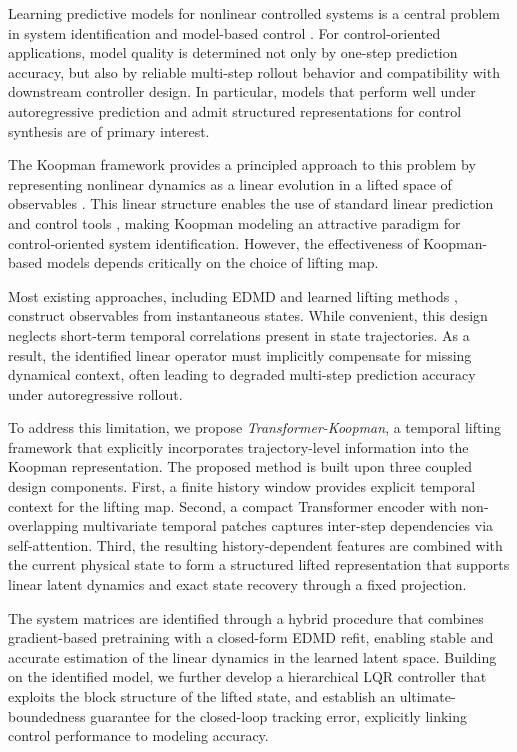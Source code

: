 \documentclass[journal]{IEEEtran}
\begin{document}
Learning predictive models for nonlinear controlled systems is a central problem in system identification and model-based control \cite{ljung1999system, vanoverschee1994n4sid, nelles2020nonlinear}. For control-oriented applications, model quality is determined not only by one-step prediction accuracy, but also by reliable multi-step rollout behavior and compatibility with downstream controller design. In particular, models that perform well under autoregressive prediction and admit structured representations for control synthesis are of primary interest.

The Koopman framework provides a principled approach to this problem by representing nonlinear dynamics as a linear evolution in a lifted space of observables \cite{koopman1931hamiltonian, brunton2022modern}. This linear structure enables the use of standard linear prediction and control tools \cite{otto2021koopman, korda2018linear}, making Koopman modeling an attractive paradigm for control-oriented system identification. However, the effectiveness of Koopman-based models depends critically on the choice of lifting map.

Most existing approaches, including EDMD \cite{williams2015data} and learned lifting methods \cite{lusch2018deep, takeishi2017koopman}, construct observables from instantaneous states. While convenient, this design neglects short-term temporal correlations present in state trajectories. As a result, the identified linear operator must implicitly compensate for missing dynamical context, often leading to degraded multi-step prediction accuracy under autoregressive rollout.

To address this limitation, we propose \emph{Transformer-Koopman}, a temporal lifting framework that explicitly incorporates trajectory-level information into the Koopman representation. The proposed method is built upon three coupled design components. First, a finite history window provides explicit temporal context for the lifting map. Second, a compact Transformer encoder with non-overlapping multivariate temporal patches captures inter-step dependencies via self-attention. Third, the resulting history-dependent features are combined with the current physical state to form a structured lifted representation that supports linear latent dynamics and exact state recovery through a fixed projection.

The system matrices are identified through a hybrid procedure that combines gradient-based pretraining with a closed-form EDMD refit, enabling stable and accurate estimation of the linear dynamics in the learned latent space. Building on the identified model, we further develop a hierarchical LQR controller that exploits the block structure of the lifted state, and establish an ultimate-boundedness guarantee for the closed-loop tracking error, explicitly linking control performance to modeling accuracy.
\end{document}
